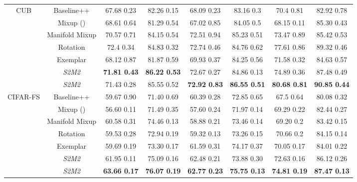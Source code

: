 \documentclass[10pt,twocolumn,letterpaper]{article}
\begin{document}
\begin{table*}[!h]
{\begin{tabular}{|c|c|c|c|c|c|c|c|}
                                
\hline
\multirow{7}{*}{CUB}            & Baseline++ & 67.68  0.23 & 82.26  0.15                                 & 68.09  0.23 & 83.16  0.3 & 70.4                                   0.81 & 82.92  0.78 \\
                                & Mixup () & 68.61  0.64 & 81.29  0.54 & 67.02  0.85 & 84.05  0.5 & 68.15  0.11 & 85.30  0.43 \\
                                & Manifold Mixup & 70.57  0.71 & 84.15  0.54 & 72.51  0.94 &  85.23  0.51 & 73.47  0.89 & 85.42  0.53 \\
& Rotation & 72.4  0.34 & 84.83  0.32 & 72.74  0.46 & 84.76  0.62 & 77.61  0.86 & 89.32  0.46 \\
                                & Exemplar& 68.12  0.87 & 81.87  0.59 & 69.93  0.37 & 84.25  0.56 & 71.58  0.32 & 84.63  0.57 \\
& \textit{S2M2} & \textbf{71.81  0.43} & \textbf{86.22  0.53} & 72.67  0.27 & 84.86  0.13 & 74.89  0.36 & 87.48  0.49\\
                                & \textit{S2M2}  & 71.43  0.28 & 85.55  0.52 & \textbf{72.92  0.83} & \textbf{86.55  0.51} & \textbf{80.68  0.81} & \textbf{90.85  0.44}\\
\hline
\multirow{7}{*}{CIFAR-FS}       & Baseline++ & 59.67  0.90 & 71.40  0.69                                 & 60.39  0.28 & 72.85  0.65 & 67.5                                  0.64 & 80.08  0.32 \\
                                & Mixup () & 56.60  0.11 & 71.49  0.35 & 57.60  0.24 & 71.97  0.14 & 69.29  0.22 & 82.44  0.27 \\
                                & Manifold Mixup & 60.58  0.31 & 74.46  0.13 & 58.88  0.21 & 73.46  0.14 & 69.20  0.2 & 83.42  0.15\\
& Rotation & 59.53  0.28 & 72.94  0.19 & 59.32  0.13 &  73.26  0.15 & 70.66  0.2 & 84.15  0.14 \\
                                & Exemplar  &59.69  0.19 & 73.30  0.17 & 61.59  0.31 & 74.17  0.37 & 70.05  0.17 & 84.01  0.22 \\
& \textit{S2M2}  & 61.95  0.11 & 75.09  0.16 & 62.48  0.21 & 73.88  0.30 & 72.63  0.16 & 86.12  0.26 \\
                        & \textit{S2M2}  & \textbf{63.66 0.17} & \textbf{76.07 0.19} & \textbf{62.77 0.23} & \textbf{75.75 0.13} & \textbf{74.81  0.19} & \textbf{87.47  0.13}\\
\hline
\end{tabular}}
\label{table:main-results}
\end{table*}
\end{document}
